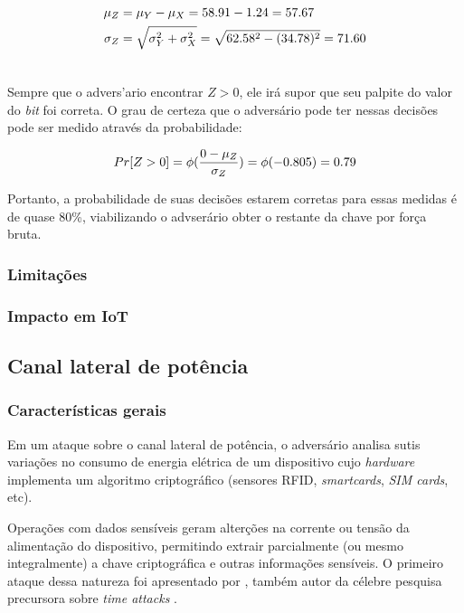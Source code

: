 \begin{align}\notag
    \mu_{Z} &= \mu_{Y} - \mu_{X} = 58.91 - 1.24 = 57.67\\\notag
    \sigma_{Z} &= \sqrt{ \sigma_{Y}^{2} + \sigma_{X}^{2}} = \sqrt{ 62.58^{2} - (34.78)^{2}} = 71.60\\ \notag
\end{align}

Sempre que o advers'{a}rio encontrar $Z > 0$, ele ir\'{a} supor que seu palpite do valor do \textit{bit} foi correta. O grau de certeza que o advers\'{a}rio pode ter nessas decis\~{o}es pode ser medido atrav\'{e}s da probabilidade:

\begin{align}
    Pr[Z > 0] = \phi(\dfrac{0 - \mu_{Z}}{\sigma_{Z}}) = \phi(-0.805) = 0.79\notag
\end{align}

Portanto, a probabilidade de suas decis\~{o}es estarem corretas para essas medidas \'{e} de quase 80\%, viabilizando o advser\'{a}rio obter o restante da chave por for\c{c}a bruta.

\subsubsection{Limitações}

\subsubsection{Impacto em IoT}

\subsection{Canal lateral de potência}

\subsubsection{Características gerais}
Em um ataque sobre o canal lateral de pot\^{e}ncia, o advers\'{a}rio analisa sutis varia\c{c}\~{o}es no consumo de energia el\'{e}trica de um dispositivo cujo \textit{hardware} implementa um algoritmo criptogr\'{a}fico (sensores RFID, \textit{smartcards}, \textit{SIM cards}, etc).

Opera\c{c}\~{o}es com dados sens\'{i}veis geram alter\c{c}\~{o}es na corrente ou tens\~{a}o da alimenta\c{c}\~{a}o do dispositivo, permitindo extrair parcialmente (ou mesmo integralmente) a chave criptogr\'{a}fica e outras informa\c{c}\~{o}es  sens\'{i}veis. O primeiro ataque dessa natureza foi apresentado por \cite{Kocher:1999:DPA:646764.703989}, tamb\'{e}m autor da c\'{e}lebre pesquisa precursora sobre \textit{time attacks} \cite{Kocher96}. 

